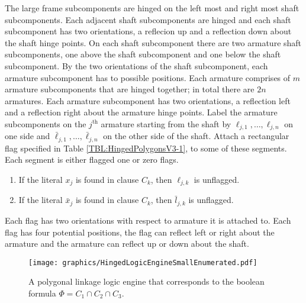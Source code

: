 The large frame subcomponents are hinged on the left most and right most shaft subcomponents. 
Each adjacent shaft subcomponents are hinged and each shaft subcomponent has two orientations, a reflecion up and a reflection down about the shaft hinge points.  
On each shaft subcomponent there are two armature shaft subcomponents, one above the shaft subcomponent and one below the shaft subcomponent.  
By the two orientations of the shaft subcomponent, each armature subcomponent has to possible positions.  
Each armature comprises of $m$ armature subcomponents that are hinged together; in total there are $2n$ armatures.  
Each armature subcomponent has two orientations, a reflection left and a reflection right about the armature hinge points.  
Label the armature subcomponents on the $j^\text{th}$ armature starting from the shaft by $\ell_{j,1},\ldots,\ell_{j,n}$ on one side and  $\bar{\ell}_{j,1},\ldots,\bar{\ell}_{j,n}$ on the other side of the shaft.  
Attach a rectangular flag specified in Table \ref{TBL:HingedPolygonsV3-1}, to some of these segments. 
Each segment is either flagged one or zero flags.
\begin{enumerate}
	 \item If the literal $x_j$ is found in clause $C_k$, then $\ell_{j,k}$ is unflagged.
	 \item If the literal $\bar{x}_j$ is found in clause $C_k$, then $\bar{l}_{j,k}$ is unflagged.
\end{enumerate}

Each flag has two orientations with respect to armature it is attached to.  Each flag has four potential positions, the flag can reflect left or right about the armature and the armature can reflect up or down about the shaft.

\begin{figure}[!htbp]
\begin{center}
\texttt{[image: graphics/HingedLogicEngineSmallEnumerated.pdf]}
\caption{A polygonal linkage logic engine that corresponds to the boolean formula $\Phi = C_1 \cap C_2 \cap C_3$.}\label{fig:HingedLogicEngineSmallEnumerated.pdf}
\end{center}
\end{figure}

